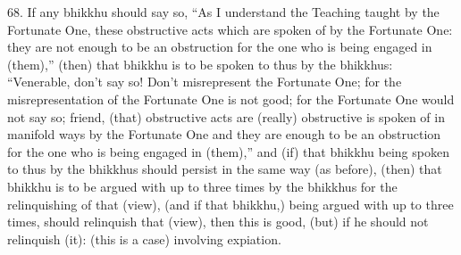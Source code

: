 \documentclass[12pt]{article}
\begin{document}
\begin{paracol}{2}
\begin{column}
{\begin{doublespace}
68. If any bhikkhu should say so, “As I understand the Teaching taught by the Fortunate One, these obstructive acts which are spoken of by the Fortunate One: they are not enough to be an obstruction for the one who is being engaged in (them),” (then) that bhikkhu is to be spoken to thus by the bhikkhus: “Venerable, don't say so! Don't misrepresent the Fortunate One; for the misrepresentation of the Fortunate One is not good; for the Fortunate One would not say so; friend, (that) obstructive acts are (really) obstructive is spoken of in manifold ways by the Fortunate One and they are enough to be an obstruction for the one who is being engaged in (them),” and (if) that bhikkhu being spoken to thus by the bhikkhus should persist in the same way (as before), (then) that bhikkhu is to be argued with up to three times by the bhikkhus for the relinquishing of that (view), (and if that bhikkhu,) being argued with up to three times, should relinquish that (view), then this is good, (but) if he should not relinquish (it): (this is a case) involving expiation.
\end{doublespace}}

\switchcolumn



\end{column}
\end{paracol}
\end{document}
